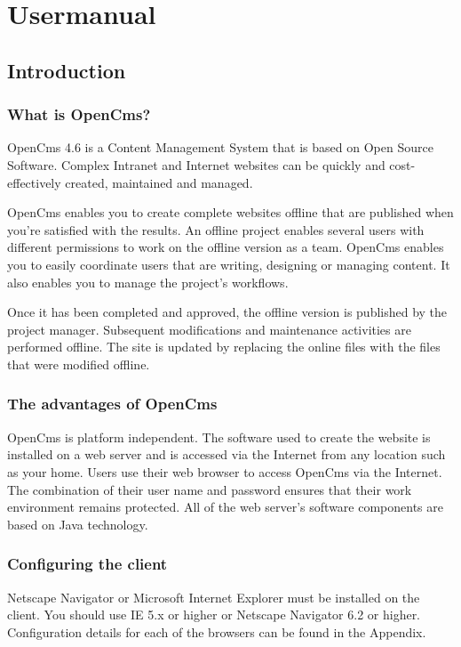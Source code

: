 \chapter{Usermanual}

\section{Introduction}

\subsection{What is OpenCms?}

OpenCms 4.6 is a Content Management System that is based on Open
Source Software. Complex Intranet and Internet websites can be
quickly and cost-effectively created, maintained and managed.

OpenCms enables you to create complete websites offline that are
published when you're satisfied with the results. An offline
project enables several users with different permissions to work
on the offline version as a team. OpenCms enables you to easily
coordinate users that are writing, designing or managing content.
It also enables you to manage the project's workflows.

Once it has been completed and approved, the offline version is
published by the project manager. Subsequent modifications and
maintenance activities are performed offline. The site is updated
by replacing the online files with the files that were modified
offline.

\subsection{The advantages of OpenCms}

OpenCms is platform independent. The software used to create the
website is installed on a web server and is accessed via the
Internet from any location such as your home. Users use their web
browser to access OpenCms via the Internet. The combination of
their user name and password ensures that their work environment
remains protected. All of the web server's software components are
based on Java technology.

\subsection{Configuring the client}

Netscape Navigator or Microsoft Internet Explorer must be
installed on the client. You should use IE 5.x or higher or
Netscape Navigator 6.2 or higher. Configuration details for each of
the browsers can be found in the Appendix. 

